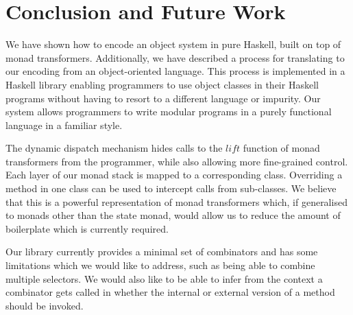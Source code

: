 

\section{Conclusion and Future Work}
\label{sec:conclusions}

We have shown how to encode an object system in pure Haskell, built on top of monad transformers. Additionally, we have described a process for translating to our encoding from an object-oriented language. This process is implemented in a Haskell library enabling programmers to use object classes in their Haskell programs without having to resort to a different language or impurity. Our system allows programmers to write modular programs in a purely functional language in a familiar style. 

The dynamic dispatch mechanism hides calls to the $\mathit{lift}$ function of monad transformers from the programmer, while also allowing more fine-grained control. Each layer of our monad stack is mapped to a corresponding class. Overriding a method in one class can be used to intercept calls from sub-classes. We believe that this is a powerful representation of monad transformers which, if generalised to monads other than the state monad, would allow us to reduce the amount of boilerplate which is currently required.

Our library currently provides a minimal set of combinators and has some limitations which we would like to address, such as being able to combine multiple selectors. We would also like to be able to infer from the context a combinator gets called in whether the internal or external version of a method should be invoked.

